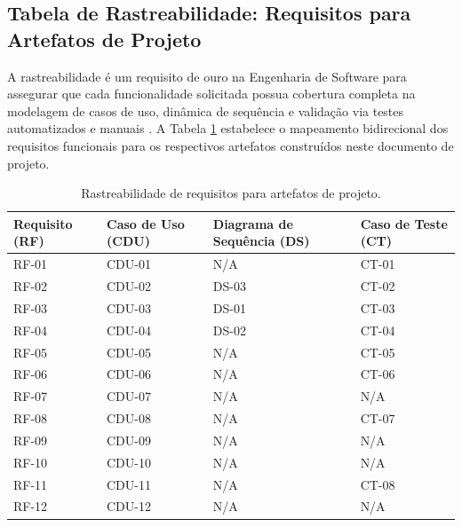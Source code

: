 \subsection{Tabela de Rastreabilidade: Requisitos para Artefatos de Projeto}

A rastreabilidade é um requisito de ouro na Engenharia de Software para assegurar que cada funcionalidade solicitada possua cobertura completa na modelagem de casos de uso, dinâmica de sequência e validação via testes automatizados e manuais \cite{pressman2016, myers2011}. A Tabela \ref{tab:rastreabilidade} estabelece o mapeamento bidirecional dos requisitos funcionais para os respectivos artefatos construídos neste documento de projeto.

\begin{table}[htbp]
\centering
\small
\caption{Rastreabilidade de requisitos para artefatos de projeto.}
\label{tab:rastreabilidade}
\begin{tabularx}{\textwidth}{|>{\centering\arraybackslash}X|>{\centering\arraybackslash}X|>{\centering\arraybackslash}X|>{\centering\arraybackslash}X|}
\hline
\textbf{Requisito (RF)} & \textbf{Caso de Uso (CDU)} & \textbf{Diagrama de Sequência (DS)} & \textbf{Caso de Teste (CT)} \\
\hline
RF-01 & CDU-01 & N/A & CT-01 \\
\hline
RF-02 & CDU-02 & DS-03 & CT-02 \\
\hline
RF-03 & CDU-03 & DS-01 & CT-03 \\
\hline
RF-04 & CDU-04 & DS-02 & CT-04 \\
\hline
RF-05 & CDU-05 & N/A & CT-05 \\
\hline
RF-06 & CDU-06 & N/A & CT-06 \\
\hline
RF-07 & CDU-07 & N/A & N/A \\
\hline
RF-08 & CDU-08 & N/A & CT-07 \\
\hline
RF-09 & CDU-09 & N/A & N/A \\
\hline
RF-10 & CDU-10 & N/A & N/A \\
\hline
RF-11 & CDU-11 & N/A & CT-08 \\
\hline
RF-12 & CDU-12 & N/A & N/A \\
\hline
\end{tabularx}\\
\autoria
\end{table}
